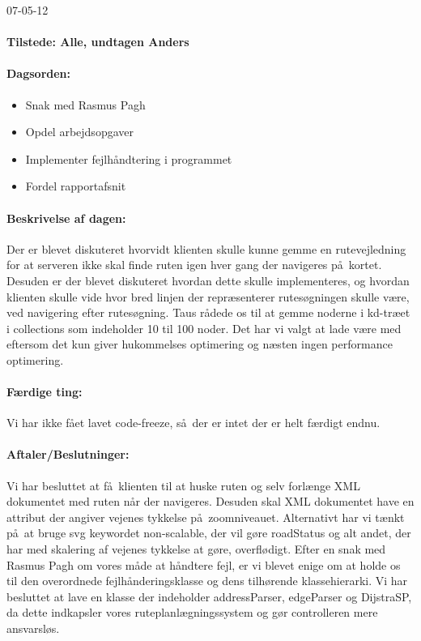 \documentclass[a4paper,10pt,titlepage]{article}
\begin{document}
\begin{center}
		07-05-12
		\end{center}
		
		\paragraph{Tilstede: Alle, undtagen Anders}
		\paragraph{Dagsorden:}
		\begin{itemize}
					\item Snak med Rasmus Pagh
					\item Opdel arbejdsopgaver
					\item Implementer fejlh\aa ndtering i programmet
					\item Fordel rapportafsnit
		\end{itemize}
		
		\paragraph{Beskrivelse af dagen:}
		Der er blevet diskuteret hvorvidt klienten skulle kunne gemme en rutevejledning for at serveren ikke skal finde ruten igen hver gang der navigeres p\aa \ kortet. Desuden er der blevet diskuteret hvordan dette skulle implementeres, og hvordan klienten skulle vide hvor bred linjen der repr\ae senterer rutes\o gningen skulle v\ae re, ved navigering efter rutes\o gning. 
Taus r\aa dede os til at gemme noderne i kd-tr\ae et i collections som indeholder 10 til 100 noder. Det har vi valgt at lade v\ae re med eftersom det kun giver hukommelses optimering og n\ae sten ingen performance optimering. 

		\paragraph{F\ae rdige ting:}
		Vi har ikke f\aa et lavet code-freeze, s\aa \ der er intet der er helt f\ae rdigt endnu.
		\paragraph{Aftaler/Beslutninger:}
		Vi har besluttet at f\aa \ klienten til at huske ruten og selv forl\ae nge XML dokumentet med ruten n\aa r der navigeres. Desuden skal XML dokumentet have en attribut der angiver vejenes tykkelse p\aa \ zoomniveauet. Alternativt har vi t\ae nkt p\aa \ at bruge svg keywordet non-scalable, der vil g\o re roadStatus og alt andet, der har med skalering af vejenes tykkelse at g\o re, overfl\o digt. 
Efter en snak med Rasmus Pagh om vores m\aa de at h\aa ndtere fejl, er vi blevet enige om at holde os til den overordnede fejlh\aa nderingsklasse og dens tilh\o rende klassehierarki. 
Vi har besluttet at lave en klasse der indeholder addressParser, edgeParser og DijstraSP, da dette indkapsler vores ruteplanl\ae gningssystem og g\o r controlleren mere ansvarsl\o s.
 
\end{document}
